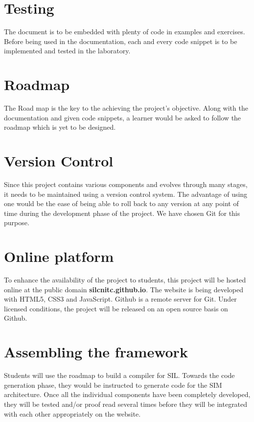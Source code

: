 \section{Testing}

The document is to be embedded with plenty of code in examples and exercises. Before being used in the documentation, each and every code snippet is to be implemented and tested in the laboratory. 

\section{Roadmap}

The Road map is the key to the achieving the project's objective. Along with the documentation and given code snippets, a learner would be asked to follow the roadmap which is yet to be designed.
 
\section{Version Control}
Since this project contains various components and evolves through many stages, it needs to be maintained using a version control system. The advantage of using one would be the ease of  being able to roll back to any version at any point of time during the development phase of the project. We have chosen Git for this purpose.

\section{Online platform}
To enhance the availability of the project to students, this project will be hosted online at the public domain \textbf{silcnitc.github.io}. The website is being developed with HTML5, CSS3 and JavaScript. Github is a remote server for Git. Under licensed conditions, the project will be released on an open source basis on Github. 

\section{Assembling the framework}
Students will use the roadmap to build a compiler for SIL. Towards the code generation phase, they would be instructed to generate code for the SIM architecture\cite{citation-4-name-here}. Once all the individual components have been completely developed, they will be tested and/or proof read several times before they will be integrated with each other appropriately on the website.